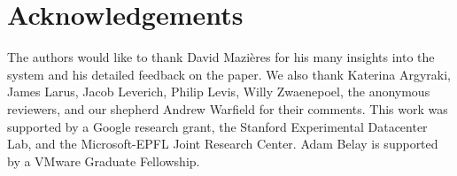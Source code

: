
\section*{Acknowledgements}

The authors would like to thank David Mazi{\`e}res for his many
insights into the system and his detailed feedback on the
paper. We also thank Katerina Argyraki, James Larus, Jacob Leverich, Philip Levis, Willy
Zwaenepoel, the anonymous reviewers, and our shepherd Andrew Warfield for their comments.
This work was supported by a Google research grant, the Stanford Experimental Datacenter Lab,
and the Microsoft-EPFL Joint Research Center. Adam Belay is supported
by a VMware Graduate Fellowship.  

